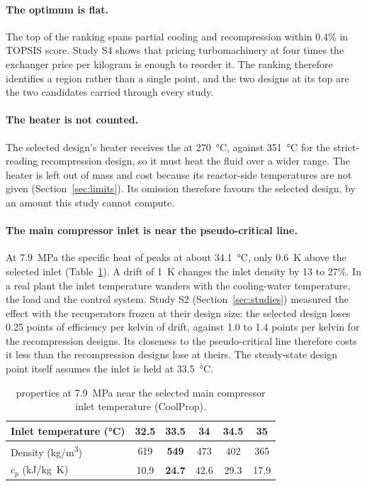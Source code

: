 \paragraph{The optimum is flat.} The top of the ranking spans partial cooling and recompression within 0.4\% in TOPSIS score. Study S4 shows that pricing turbomachinery at four times the exchanger price per kilogram is enough to reorder it. The ranking therefore identifies a region rather than a single point, and the two designs at its top are the two candidates carried through every study.

\paragraph{The heater is not counted.} The selected design's heater receives the \cotwo{} at \SI{270}{\celsius}, against \SI{351}{\celsius} for the strict-reading recompression design, so it must heat the fluid over a wider range. The heater is left out of mass and cost because its reactor-side temperatures are not given (Section~\ref{sec:limits}). Its omission therefore favours the selected design, by an amount this study cannot compute.

\paragraph{The main compressor inlet is near the pseudo-critical line.} At \SI{7.9}{MPa} the specific heat of \cotwo{} peaks at about \SI{34.1}{\celsius}, only \SI{0.6}{K} above the selected inlet (Table~\ref{tab:inletprops}). A drift of \SI{1}{K} changes the inlet density by 13 to 27\%. In a real plant the inlet temperature wanders with the cooling-water temperature, the load and the control system. Study S2 (Section~\ref{sec:studies}) measured the effect with the recuperators frozen at their design size: the selected design loses 0.25 points of efficiency per kelvin of drift, against 1.0 to 1.4 points per kelvin for the recompression designs. Its closeness to the pseudo-critical line therefore costs it less than the recompression designs lose at theirs. The steady-state design point itself assumes the inlet is held at \SI{33.5}{\celsius}.

\begin{table}[h]\centering\small
\begin{tabular}{@{}lccccc@{}}
\toprule
Inlet temperature (\si{\celsius}) & 32.5 & \textbf{33.5} & 34 & 34.5 & 35\\
\midrule
Density (\si{kg/m^3}) & 619 & \textbf{549} & 473 & 402 & 365\\
$c_p$ (\si{kJ/kg.K}) & 10.9 & \textbf{24.7} & 42.6 & 29.3 & 17.9\\
\bottomrule
\end{tabular}
\caption{\cotwo{} properties at \SI{7.9}{MPa} near the selected main compressor inlet temperature (CoolProp).}\label{tab:inletprops}
\end{table}

